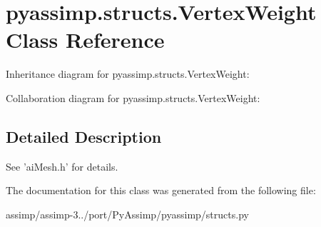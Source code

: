 \hypertarget{classpyassimp_1_1structs_1_1_vertex_weight}{\section{pyassimp.\+structs.\+Vertex\+Weight Class Reference}
\label{classpyassimp_1_1structs_1_1_vertex_weight}
}


Inheritance diagram for pyassimp.\+structs.\+Vertex\+Weight\+:


Collaboration diagram for pyassimp.\+structs.\+Vertex\+Weight\+:


\subsection{Detailed Description}
\begin{DoxyVerb}See 'aiMesh.h' for details.
\end{DoxyVerb}
 

The documentation for this class was generated from the following file\+:\begin{DoxyCompactItemize}
\item 
assimp/assimp-\/3../port/\+Py\+Assimp/pyassimp/structs.\+py\end{DoxyCompactItemize}
